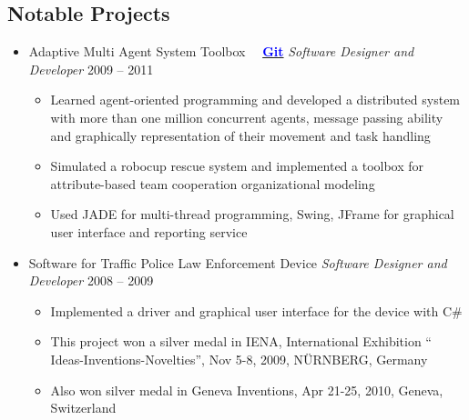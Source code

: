 \documentclass[letter]{res}
\begin{document}
\begin{resume}
		
		\section{Notable Projects}
		\begin{itemize}[leftmargin=-.1in]
			\item Adaptive Multi Agent System Toolbox ~~{\href{https://github.com/omid55/team_based_rescue_jade_multi_agent_system}{\textbf{\textcolor{blue}{Git}}}} \newline
			{\sl Software Designer and Developer} \hfill 2009 – 2011\\
			\vspace{-4mm}
			\iflong
			\begin{itemize}
				\item Learned agent-oriented programming and developed a distributed system with more than one million concurrent agents, message passing ability and graphically representation of their movement and task handling
				\item Simulated a robocup rescue system and implemented a toolbox for 				attribute-based team cooperation organizational modeling
				\item Used JADE for multi-thread programming, Swing, JFrame for graphical user interface and reporting service
			\end{itemize}
			\fi
			
			\item Software for Traffic Police Law Enforcement Device \newline
			{\sl Software Designer and Developer} \hfill 2008 – 2009\\
			\vspace{-4mm}
			\iflong
			\begin{itemize}
				\item Implemented a driver and graphical user interface for the device with C\#
				\item This project won a silver medal in IENA, International Exhibition `` Ideas-Inventions-Novelties'', Nov 5-8, 2009, N\"{U}RNBERG, Germany
				\item Also won silver medal in Geneva Inventions, Apr 21-25, 2010, Geneva, Switzerland
			\end{itemize}
			\fi
			

\end{itemize}
\end{resume}
\end{document}
